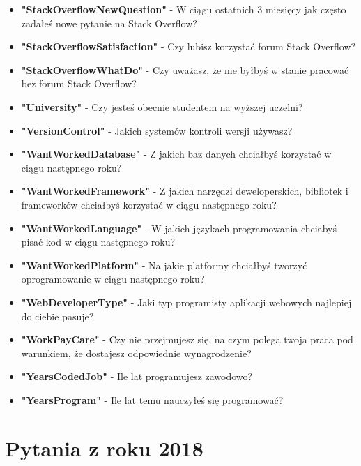 \begin{appendices}
\begin{itemize}
        \item \textbf{"StackOverflowNewQuestion"} - W ciągu ostatnich 3 miesięcy jak często zadałeś nowe pytanie na Stack Overflow?
        \item \textbf{"StackOverflowSatisfaction"} - Czy lubisz korzystać forum Stack Overflow?
        \item \textbf{"StackOverflowWhatDo"} - Czy uważasz, że nie byłbyś w stanie pracować bez forum Stack Overflow?
        \item \textbf{"University"} - Czy jesteś obecnie studentem na wyższej uczelni?
        \item \textbf{"VersionControl"} - Jakich systemów kontroli wersji używasz?
        \item \textbf{"WantWorkedDatabase"} - Z jakich baz danych chciałbyś korzystać w ciągu następnego roku?
        \item \textbf{"WantWorkedFramework"} - Z jakich narzędzi deweloperskich, bibliotek i frameworków chciałbyś korzystać w ciągu następnego roku?
        \item \textbf{"WantWorkedLanguage"} - W jakich językach programowania chciabyś pisać kod w ciągu następnego roku?
        \item \textbf{"WantWorkedPlatform"} - Na jakie platformy chciałbyś tworzyć oprogramowanie w ciągu następnego roku?
        \item \textbf{"WebDeveloperType"} - Jaki typ programisty aplikacji webowych najlepiej do ciebie pasuje?
        \item \textbf{"WorkPayCare"} - Czy nie przejmujesz się, na czym polega twoja praca pod warunkiem, że dostajesz odpowiednie wynagrodzenie?
        \item \textbf{"YearsCodedJob"} - Ile lat programujesz zawodowo?
        \item \textbf{"YearsProgram"} - Ile lat temu nauczyłeś się programować?
    \end{itemize}


    \section{Pytania z roku 2018}\label{pytania-2018}



\end{appendices}
